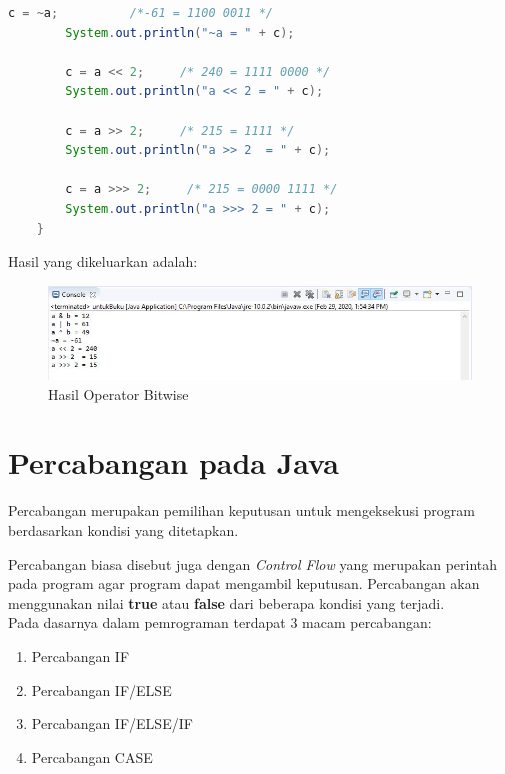 \begin{enumerate}
\begin{lstlisting}[language=Java]
        c = ~a;          /*-61 = 1100 0011 */
        System.out.println("~a = " + c);

        c = a << 2;     /* 240 = 1111 0000 */
        System.out.println("a << 2 = " + c);

        c = a >> 2;     /* 215 = 1111 */
        System.out.println("a >> 2  = " + c);

        c = a >>> 2;     /* 215 = 0000 1111 */
        System.out.println("a >>> 2 = " + c);
    }        
    \end{lstlisting}
    Hasil yang dikeluarkan adalah:
    \begin{figure}[htbp!]
        \centering
        \includegraphics[scale=0.6]{pictures/operator_bitwise.JPG}
        \caption{Hasil Operator Bitwise}
        \label{}
    \end{figure}
\end{enumerate}

\section{Percabangan pada Java}
Percabangan merupakan pemilihan keputusan untuk mengeksekusi program berdasarkan kondisi yang ditetapkan. \cite{HengkyPercabangan}

Percabangan biasa disebut juga dengan \textit{Control Flow} yang merupakan perintah pada program agar program dapat mengambil keputusan. Percabangan akan menggunakan nilai \textbf{true} atau \textbf{false} dari beberapa kondisi yang terjadi.\\

Pada dasarnya dalam pemrograman terdapat 3 macam percabangan:
\begin{enumerate}
    \item Percabangan IF
    \item Percabangan IF/ELSE 
    \item Percabangan IF/ELSE/IF 
    \item Percabangan CASE
\end{enumerate}

\newpage
